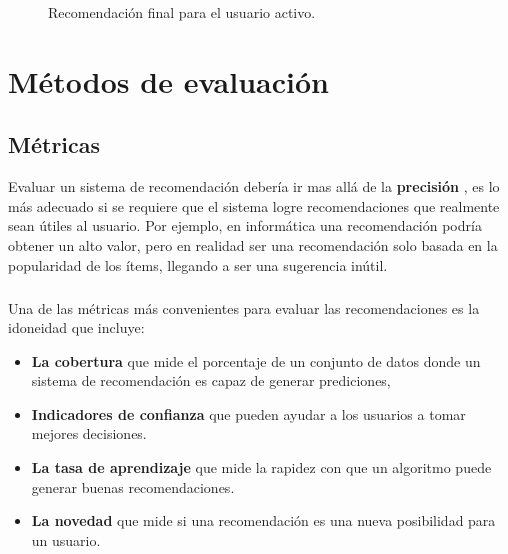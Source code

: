 \documentclass[12pt,letterpaper,oneside] {memoir}
\begin{document}
\begin{figure}[H]
\centering 
{} \caption{Recomendación final para el usuario activo.} 
\label{fig:p8} 
\end{figure}


\chapter[Métodos de evaluación]{Métodos de evaluación}

\section{Métricas}

Evaluar un sistema de recomendación debería ir mas allá de la \textbf{precisión} \citep{Adomavicius2005, Herlocker1991}, es lo más adecuado si se requiere que el sistema logre recomendaciones que realmente sean útiles al usuario. Por ejemplo, en informática una recomendación podría obtener un alto valor, pero en realidad ser una recomendación solo basada en la popularidad de los ítems, llegando a ser una sugerencia inútil.
\paragraph{}
Una de las métricas más convenientes para evaluar las recomendaciones es la idoneidad \citep{Herlocker2004} que incluye:
\begin{itemize}
\item \textbf{La cobertura} que mide el porcentaje de un conjunto de datos donde un sistema de recomendación es capaz de generar prediciones, 
\item \textbf{Indicadores de confianza} que pueden ayudar a los usuarios a tomar mejores decisiones.
\item \textbf{La tasa de aprendizaje} que mide la rapidez con que un algoritmo puede generar buenas recomendaciones.
\item \textbf{La novedad} que mide si una recomendación es una nueva posibilidad para un usuario.
 \end{itemize}
 
\end{document}
